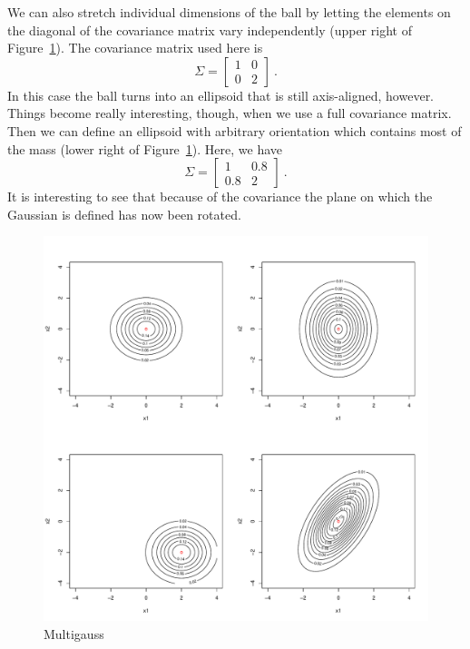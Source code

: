\documentclass[a4paper,11pt,leqno]{report}\usepackage[]{graphicx}\usepackage[]{color}
\makeatletter
\def\maxwidth{ %
  \ifdim\Gin@nat@width>\linewidth
    \linewidth
  \else
    \Gin@nat@width
  \fi
}
\newenvironment{knitrout}{}{} %
\makeatother
\begin{document}
We can also stretch individual dimensions of the ball by letting the elements on the diagonal of the
covariance matrix vary independently (upper right of Figure~\ref{fig:multiGauss}). The covariance matrix used here is 
\begin{equation*}
\Sigma = \begin{bmatrix}
1 & 0 \\
0 & 2
\end{bmatrix} \ .
\end{equation*}
In this case the ball turns into an ellipsoid that is still axis-aligned, however. 
Things become really interesting, though, when we use a full covariance matrix. Then we can define an 
ellipsoid with arbitrary orientation which contains most of the mass (lower right of Figure~\ref{fig:multiGauss}). Here, we have
\begin{equation*}
\Sigma = \begin{bmatrix}
1 & 0.8 \\
0.8 & 2
\end{bmatrix} \ .
\end{equation*}
It is interesting to see that because of the covariance the plane on which the Gaussian is defined has now been rotated.

\begin{figure}
\begin{knitrout}
\color{fgcolor}
\includegraphics[width=\maxwidth]{figures/multiGauss-1} 

\end{knitrout}
\caption{Multigauss}
\label{fig:multiGauss}
\end{figure}
\end{document}
